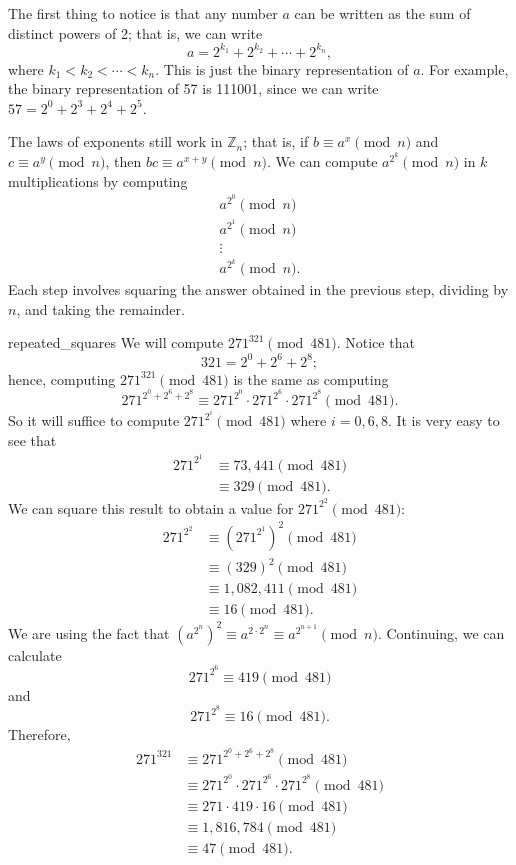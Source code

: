  
The first thing to notice is that any number $a$ can be written as the
sum of distinct powers of 2; that is, we can write
\[
a = 2^{k_1} + 2^{k_2} + \cdots + 2^{k_n},
\]
where $k_1 < k_2 < \cdots < k_n$.  This is just the binary
representation of $a$. For example, the binary representation of 57 is
111001, since we can write $57 = 2^0 + 2^3 + 2^4 + 2^5$.
 
 
The laws of exponents still work in ${\mathbb Z}_n$; that is, if $b
\equiv a^x \pmod{ n}$ and $c \equiv a^y \pmod{ n}$, then $bc \equiv
a^{x+y} \pmod{ n}$. We can compute $a^{2^k} \pmod{ n}$ in $k$
multiplications by computing 
\begin{gather*}
a^{2^0} \pmod{ n} \\
a^{2^1} \pmod{ n }\\
\vdots \\
a^{2^k} \pmod{ n}.
\end{gather*}
Each step involves squaring the answer obtained in the previous step,
dividing by $n$, and taking the remainder.
 
 
\begin{example}{repeated_squares}
We will compute $271^{321} \pmod{ 481}$. Notice that
\[
321 = 2^0 +2^6 + 2^8;
\]
hence, computing $271^{ 321} \pmod{ 481}$ is the same as computing
\[
271^{ 2^0 +2^6 + 2^8 } \equiv 271^{ 2^0 } \cdot 271^{2^6 } \cdot 271^{ 2^8 } \pmod{ 481}.
\]
So it will suffice to compute $271^{ 2^i } \pmod{ 481}$ where $i = 0,
6, 8$. It is very easy to see that 
\begin{align*}
271^{ 2^1}  & \equiv 73,441 \pmod{ 481}  \\
& \equiv 329 \pmod{ 481}.
\end{align*}
We can square this result to obtain a value for $271^{ 2^2} \pmod{481}$: 
\begin{align*}
271^{ 2^2}  & \equiv (271^{ 2^1})^2 \pmod{ 481} \\ 
& \equiv (329)^2 \pmod{ 481} \\
& \equiv 1,082,411 \pmod{ 481} \\
& \equiv 16 \pmod{ 481}.
\end{align*}
We are using the fact that $(a^{2^n})^2  \equiv a^{2 \cdot 2^n} \equiv
a^{ 2^{n+1} } \pmod{ n}$. Continuing, we can calculate
\[
271^{ 2^6 } \equiv 419 \pmod{ 481}
\]
and
\[
271^{ 2^8 }  \equiv 16 \pmod{ 481}.
\]
Therefore,
\begin{align*}
271^{ 321}
& \equiv 271^{ 2^0 +2^6 + 2^8 } \pmod{ 481} \\
& \equiv 271^{ 2^0 } \cdot 271^{ 2^6 } \cdot 271^{ 2^8 } \pmod{ 481} \\
& \equiv 271 \cdot 419 \cdot 16 \pmod{ 481} \\
& \equiv 1,816,784 \pmod{ 481} \\
& \equiv 47 \pmod{ 481}.
\end{align*}
\end{example}
 
